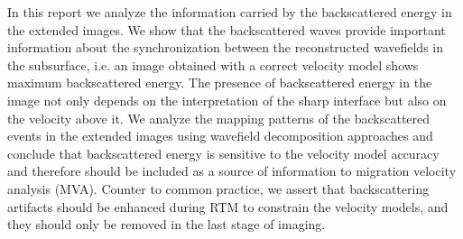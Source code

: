 In this report we analyze the information carried by the backscattered energy in the extended
 images. We show that the backscattered waves provide important information about the 
synchronization between the reconstructed wavefields in the subsurface, i.e. an image obtained with a correct velocity model shows maximum backscattered
energy. The presence of backscattered energy in the image not only depends on the interpretation
of the sharp interface but also on the velocity above it. We analyze the mapping patterns of the backscattered
events in the extended images using wavefield decomposition approaches and conclude that backscattered energy
is sensitive to the velocity model accuracy and therefore should be included as a source
of information to migration velocity analysis (MVA). Counter to common practice, we assert that
backscattering artifacts should be enhanced during RTM to constrain the velocity models,
and they should only be removed in the last stage of imaging.



